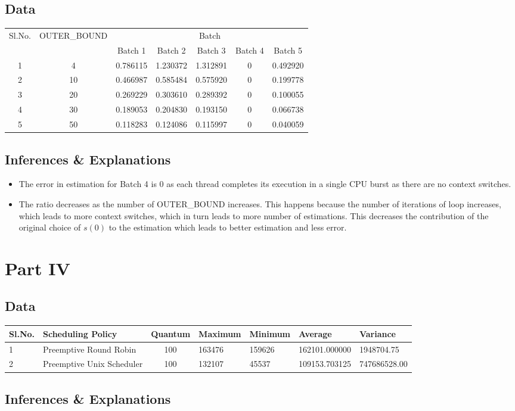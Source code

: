 \documentclass{article}
\begin{document}
\subsection{Data}
\begin{center}
    \begin{tabular}{| c | c | c | c | c | c | c |}
    \hline
    \multirow{2}{*}{Sl.No.} & \multirow{2}{*}{OUTER\_BOUND} & \multicolumn{5}{|c|}{Batch}\\ \cline{3-7}
    
     &  & Batch 1 & Batch 2 & Batch 3 & Batch 4 & Batch 5\\ \hline
     1 & 4 & 0.786115 & 1.230372 & 1.312891 & 0 & 0.492920 \\
     2 & 10 & 0.466987 & 0.585484 & 0.575920 & 0 & 0.199778\\
     3 & 20 & 0.269229 & 0.303610 & 0.289392 & 0 & 0.100055\\
     4 & 30 & 0.189053 & 0.204830 & 0.193150 & 0 & 0.066738\\
     5 & 50 & 0.118283 & 0.124086 & 0.115997 & 0 & 0.040059\\
    \hline
    \end{tabular}
\end{center}
\subsection{Inferences \& Explanations}
\begin{itemize}
  \item The error in estimation for Batch 4 is $0$ as each thread completes its execution in a single CPU burst as there are no context switches.
  \item The ratio decreases as the number of OUTER\_BOUND increases. This happens because the number of iterations of loop increases, which leads to more context switches, which in turn leads to more number of estimations. This decreases the contribution of the original choice of $s(0)$ to the estimation which leads to better estimation and less error.
\end{itemize}
\section{Part IV}
\subsection{Data}
\begin{center}
    \begin{tabular}{| l | l | c | l | l | l | l |}
    \hline
    Sl.No. & Scheduling Policy & Quantum & Maximum & Minimum & Average & Variance \\ \hline
    1 & Preemptive Round Robin & 100 & 163476 & 159626 & 162101.000000 & 1948704.75\\
    2 & Preemptive Unix Scheduler & 100 & 132107 & 45537 & 109153.703125 & 747686528.00\\
    \hline
    \end{tabular}
\end{center}
\subsection{Inferences \& Explanations}
\end{document}
